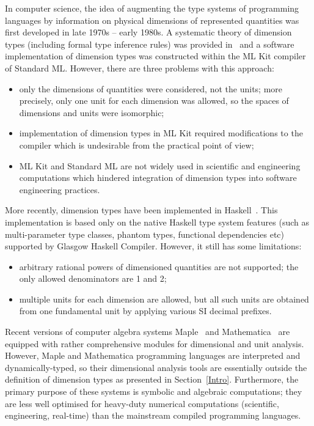 \documentclass[11pt,a4paper]{article}
\begin{document}
In computer science, the idea of augmenting the type systems of programming
languages by information on physical dimensions of represented quantities was
first developed in late 1970s -- early 1980s. A systematic theory of dimension
types (including formal type inference rules) was provided
in~\cite{Kennedy1994,Kennedy1997} and a software implementation of dimension
types was constructed within the ML Kit compiler of Standard ML. However,
there are three problems with this approach:
\begin{itemize}
\item only the dimensions of quantities were considered, not the units; more
			precisely, only one unit for each dimension was allowed, so the spaces
			of dimensions and units were isomorphic;
\item implementation of dimension types in ML Kit required modifications to the
			compiler which is undesirable from the practical point of view;
\item ML Kit and Standard ML are not widely used in scientific and engineering
			computations which hindered integration of dimension types into software
			engineering practices.
\end{itemize}

More recently, dimension types have been implemented in
Haskell~\cite{HaskellDims}. This implementation is based only on the native
Haskell type system features (such as multi-parameter type classes, phantom
types, functional dependencies etc) supported by Glasgow Haskell Compiler.
However, it still has some limitations:
\begin{itemize}
\item arbitrary rational powers of dimensioned quantities are not supported;
			the only allowed denominators are 1 and 2;
\item multiple units for each dimension are allowed, but all such units are
			obtained from one fundamental unit by applying various SI decimal
			prefixes.
\end{itemize}

Recent versions of computer algebra systems Maple~\cite{MapleDims} and
Mathematica~\cite{MathematicaDims} are equipped with rather comprehensive
modules for dimensional and unit analysis. However, Maple and Mathematica
programming languages are interpreted and dynamically-typed, so their
dimensional analysis tools are essentially outside the definition of
dimension types as presented in Section~\ref{Intro}. Furthermore, the primary
purpose of these systems is symbolic and algebraic computations; they are less
well optimised for heavy-duty numerical computations (scientific, engineering,
real-time) than the mainstream compiled programming languages.
\end{document}
